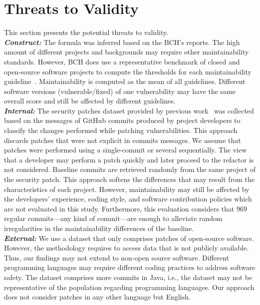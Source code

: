 \documentclass[smallextended]{svjour3}       %
\begin{document}
\section{Threats to Validity}\label{sec:threats}
%
This section presents the potential threats to validity.
%
\\\textit{\textbf{Construct:}} The formula was inferred based 
on the BCH's reports. The high amount of different projects and backgrounds 
may require other maintainability standards. However, BCH does use a 
representative benchmark of closed and open-source software projects to compute 
the thresholds for each maintainability guideline~\cite{Visser:2016:OREILLY,Baggen2012}.
Maintainability is computed as the mean of all guidelines. Different software versions 
(vulnerable/fixed) of one vulnerability may have the same overall score
and still be affected by different guidelines.
%
\\\textit{\textbf{Internal:}} The security patches dataset provided by previous
work~\cite{Reis:2017:IJSSE} was collected based on the messages of GitHub
commits produced by project developers to classify the changes performed while 
patching vulnerabilities. This approach discards patches that were
not explicit in commits messages. We assume that patches were performed 
using a single-commit or several sequentially. The view that a 
developer may perform a patch quickly and later proceed to the refactor is not considered.
Baseline commits are retrieved randomly from the same project of the security patch.
This approach softens the differences
that may result from the characteristics of each project. However,
maintainability may still be affected by the developers' experience, coding
style, and software contribution policies which are not evaluated in this study.
Furthermore, this evaluation considers that $969$ regular commits---any kind
of commit---are enough to
alleviate random irregularities in the maintainability differences of the
baseline. 
%
\\\textit{\textbf{External:}} We use a dataset that only comprises patches of open-source software.
However, the methodology requires to access data that is not publicly available.
Thus, our findings may not extend to non-open source software. Different programming 
languages may require different coding practices to address software safety. The 
dataset comprises more commits in Java, i.e., the dataset may not be representative 
of the population regarding programming languages. Our approach does not consider 
patches in any other language but English.
\end{document}
